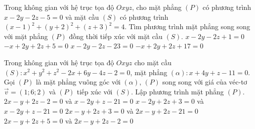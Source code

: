 \begin{ex}%
	Trong không gian với hệ trục tọa độ $Oxyz$, cho mặt phẳng $(P)$ có phương trình $x-2y-2z-5=0$ và mặt cầu $(S)$ có phương trình $(x-1)^2+(y+2)^2+(z+3)^2=4$. Tìm phương trình mặt phẳng song song với mặt phẳng $(P)$ đồng thời tiếp xúc với mặt cầu $(S)$.
	\choice
	{$x-2y-2z+1=0$}
	{$-x+2y+2z+5=0$}
	{$x-2y-2z-23=0$}
	{\True $-x+2y+2z+17=0$}
\end{ex}
\begin{ex}%
	Trong không gian với hệ trục tọa độ $Oxyz$ cho mặt cầu $(S)\colon x^2+y^2+z^2-2x+6y-4z-2=0$, mặt phẳng $(\alpha)\colon x+4y+z-11=0$. Gọi $(P)$ là mặt phẳng vuông góc với $(\alpha)$, $(P)$ song song với giá của véc-tơ $\overrightarrow{v}=(1;6;2)$ và $(P)$ tiếp xúc với $(S)$. Lập phương trình mặt phẳng $(P)$.
	\choice
	{$2x-y+2z-2=0$ và $x-2y+z-21=0$}
	{$x-2y+2z+3=0$ và $x-2y+z-21=0$}
	{\True $2x-y+2z+3=0$ và $2x-y+2z-21=0$}
	{$2x-y+2z+5=0$ và $2x-y+2z-2=0$}
\end{ex}
